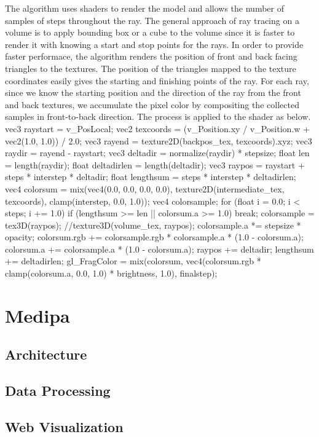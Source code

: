 \documentclass{acm_proc_article-sp}
\begin{document}
The algorithm uses shaders to render the model and allows the number of samples of steps throughout the ray. The general approach of ray tracing on a volume is to apply bounding box or a cube to the volume since it is faster to render it with knowing a start and stop points for the rays. In order to provide faster performace, the algorithm renders the position of front and back facing triangles to the textures. The position of the triangles mapped to the texture coordinates easily gives the starting and finishing points of the ray. For each ray, since we know the starting position and the direction of the ray from the front and back textures, we accumulate the pixel color by compositing the collected samples in front-to-back direction. The process is applied to the shader as below.
vec3 raystart = v_PosLocal;
vec2 texcoords = (v_Position.xy / v_Position.w + vec2(1.0, 1.0)) / 2.0;
vec3 rayend = texture2D(backpos_tex, texcoords).xyz;
vec3 raydir = rayend - raystart;
vec3 deltadir = normalize(raydir) * stepsize;
float len = length(raydir);
float deltadirlen = length(deltadir);
vec3 raypos = raystart + steps * interstep * deltadir;
float lengthsum = steps * interstep * deltadirlen;
vec4 colorsum = mix(vec4(0.0, 0.0, 0.0, 0.0), texture2D(intermediate_tex, texcoords), clamp(interstep, 0.0, 1.0));
vec4 colorsample;
for (float i = 0.0; i < steps; i += 1.0)
{
if (lengthsum >= len || colorsum.a >= 1.0) break;
colorsample = tex3D(raypos); //texture3D(volume_tex, raypos);
colorsample.a *= stepsize * opacity;
colorsum.rgb += colorsample.rgb * colorsample.a * (1.0 - colorsum.a);
colorsum.a += colorsample.a * (1.0 - colorsum.a);
raypos += deltadir;
lengthsum += deltadirlen;
}
gl_FragColor = mix(colorsum, vec4(colorsum.rgb * clamp(colorsum.a, 0.0, 1.0) * brightness, 1.0), finalstep);


\section{Medipa}

\subsection{Architecture}

\subsection{Data Processing}

\subsection{Web Visualization}
\end{document}
